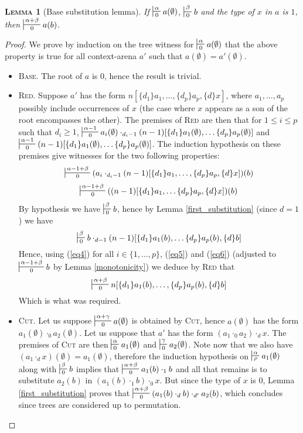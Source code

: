 \documentclass{article}
\newtheorem{lemma}{\textsc{Lemma}}
\begin{document}
\begin{lemma}[Base substitution lemma]
If $\sststile{0}{\alpha} a(\emptyset)$, $\sststile{0}{\beta} b$ and the type of $x$ in $a$ is $1$, then $\sststile{0}{\alpha+\beta} a(b)$.
\label{specialized_substitution}
\end{lemma}
\begin{proof}
We prove by induction on the tree witness for $\sststile{0}{\alpha} a(\emptyset)$ that the above property is true for all context-arena $a'$ such that $a(\emptyset) = a'(\emptyset)$.
\begin{itemize}
\item \textsc{Base.} The root of $a$ is $0$, hence the result is trivial.
\item \textsc{Red.} Suppose $a'$ has the form $n[\{d_1\}a_1, \dots, \{d_p\}a_p, \{d\}x]$, where $a_1, \dots, a_p$ possibly include occurrences of $x$ (the case where $x$ appears as a son
of the root encompasses the other). The premises of \textsc{Red} are then that for $1 \leq i \leq p$ such that
$d_i\geq 1$, $\sststile{0}{\alpha-1} a_i(\emptyset) \cdot_{d_i-1} (n-1)[\{d_1\}a_1(\emptyset), \dots \{d_p\}a_p(\emptyset)]$
and $\sststile{0}{\alpha-1} (n-1)[\{d_1\}a_1(\emptyset), \dots \{d_p\}a_p(\emptyset)]$. The induction hypothesis on these premises give witnesses for the two following properties:
\begin{eqnarray}
\sststile{0}{\alpha-1+\beta} (a_i \cdot_{d_i-1} (n-1)[\{d_1\}a_1, \dots, \{d_p\}a_p, \{d\}x])(b)\label{eq4}
\end{eqnarray}
\begin{eqnarray}
\sststile{0}{\alpha-1 +\beta} ((n-1)[\{d_1\}a_1, \dots \{d_p\}a_p, \{d\}x])(b)\label{eq5}
\end{eqnarray}
By hypothesis we have $\sststile{0}{\beta} b$, hence by Lemma \ref{first_substitution} (since $d=1$) we have
\[
\sststile{0}{\beta} b \cdot_{d-1} (n-1)[\{d_1\}a_1(b), \dots \{d_p\}a_p(b), \{d\}b]\label{eq6}
\]
Hence, using (\ref{eq4}) for all $i\in \{1, \dots, p\}$, (\ref{eq5}) and (\ref{eq6}) (adjusted to $\sststile{0}{\alpha-1+\beta} b$ by Lemma \ref{monotonicity}) we deduce by \textsc{Red} that
\[
\sststile{0}{\alpha + \beta} n[\{d_1\}a_1(b), \dots, \{d_p\}a_p(b), \{d\}b]
\]
Which is what was required.
\item \textsc{Cut.} Let us suppose $\sststile{0}{\alpha+\gamma} a(\emptyset)$ is obtained by \textsc{Cut}, hence $a(\emptyset)$ has the form $a_1(\emptyset) \cdot_0 a_2(\emptyset)$. Let us suppose
that $a'$ has the form $(a_1 \cdot_0 a_2) \cdot_d x$. The premises of \textsc{Cut} are then
$\sststile{0}{\alpha} a_1(\emptyset)$ and $\sststile{0}{\gamma} a_2(\emptyset)$. Note now that we also have $(a_1 \cdot_d x)(\emptyset) = a_1(\emptyset)$, therefore
the induction hypothesis on $\sststile{\rho}{\alpha} a_1(\emptyset)$ along with $\sststile{0}{\beta} b$ implies that
$\sststile{0}{\alpha+\beta} a_1(b) \cdot_1 b$ and all that remains is to substitute $a_2(b)$ in $(a_1(b) \cdot_1 b) \cdot_0 x$. But since the type of $x$ is $0$, Lemma \ref{first_substitution} proves
that $\sststile{0}{\alpha+\beta} (a_1(b) \cdot_d b) \cdot_{d'} a_2(b)$, which concludes since trees are considered up to permutation.
\end{itemize}
\end{proof}
\end{document}
